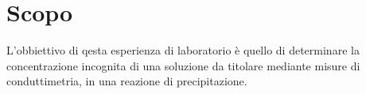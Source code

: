 \section*{Scopo}

L'obbiettivo di qesta esperienza di laboratorio è quello di determinare la concentrazione incognita di una soluzione da titolare mediante misure di conduttimetria, in una reazione di precipitazione.
